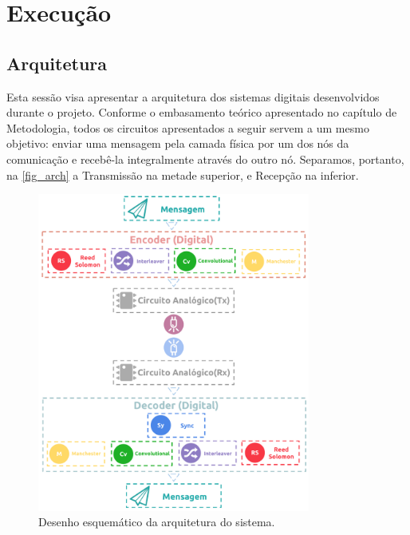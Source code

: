 	\chapter{Execução}\label{cap-execucao}
	
	\section{Arquitetura}
	Esta sessão visa apresentar a arquitetura dos sistemas digitais desenvolvidos durante o projeto. Conforme o embasamento teórico apresentado no capítulo de Metodologia, todos os circuitos apresentados a seguir servem a um mesmo objetivo: enviar uma mensagem pela camada física por um dos nós da comunicação e recebê-la integralmente através do outro nó. Separamos, portanto, na \autoref{fig_arch} a Transmissão na metade superior, e Recepção na inferior.
	
	\begin{figure}[h!]
		\caption{\label{fig_arch}Desenho esquemático da arquitetura do sistema.}
		\centering
		\includegraphics[width=0.8\textwidth]{Arquitetura.pdf}
	\end{figure}
	
